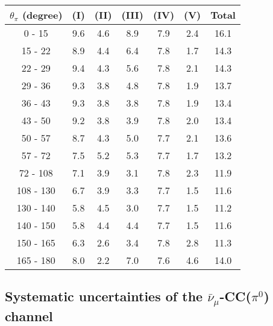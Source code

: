 \documentclass[aps, prd, reprint,showpacs,  preprintnumbers,amsmath,amssymb,superscriptaddress, nofootinbib]{revtex4-1}
\makeatletter
\newcommand{\anumu}{\ensuremath{\bar{\nu}_{\mu}}}
\renewenvironment{table}
  {\def\@captype{table}}
  {}
\makeatother
\begin{document}
\vspace{1cm}


\begin{table}
\centering
\begin{tabular}{ccccccc}
\hline
$\theta_{\pi}$ (degree) & (I) & (II) & (III) & (IV) & (V) & Total \\
\hline
 0 - 15 &     9.6  &  4.6  &  8.9  &  7.9  &  2.4  & 16.1  \\
15 - 22 &     8.9  &  4.4  &  6.4  &  7.8  &  1.7  & 14.3  \\
22 - 29 &     9.4  &  4.3  &  5.6  &  7.8  &  2.1  & 14.3  \\
29 - 36 &     9.3  &  3.8  &  4.8  &  7.8  &  1.9  & 13.7  \\
36 - 43 &     9.3  &  3.8  &  3.8  &  7.8  &  1.9  & 13.4  \\
43 - 50 &     9.2  &  3.8  &  3.9  &  7.8  &  2.0  & 13.4  \\
50 - 57 &     8.7  &  4.3  &  5.0  &  7.7  &  2.1  & 13.6  \\
57 - 72 &     7.5  &  5.2  &  5.3  &  7.7  &  1.7  & 13.2  \\
72 - 108 &    7.1  &  3.9  &  3.1  &  7.8  &  2.3  & 11.9  \\
108 - 130 &   6.7  &  3.9  &  3.3  &  7.7  &  1.5  & 11.6  \\
130 - 140 &   5.8  &  4.5  &  3.0  &  7.7  &  1.5  & 11.2  \\
140 - 150 &   5.8  &  4.4  &  4.4  &  7.7  &  1.5  & 11.6  \\
150 - 165 &   6.3  &  2.6  &  3.4  &  7.8  &  2.8  & 11.3  \\
165 - 180 &   8.0  &  2.2  &  7.0  &  7.6  &  4.6  & 14.0  \\
\hline\hline

\end{tabular}
\caption{Fractional systematic uncertainties (in percent) on $d\sigma/d\theta_\pi$.}
\label{tb:pip_theta_err}
\end{table}





\subsection{Systematic uncertainties of the $\anumu$-CC($\pi^{0}$) channel}
\end{document}
